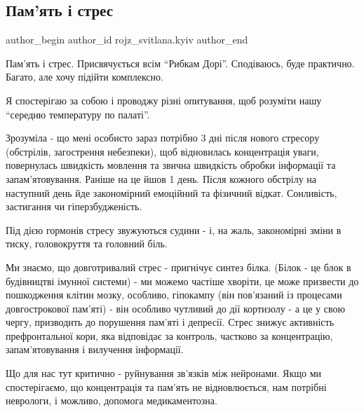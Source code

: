  
 
 
 
 

\subsection{Пам'ять і стрес}
\label{sec:30_01_2023.fb.rojz_svitlana.kyiv.1.pam_yat___stres}

\ifcmt
 author_begin
   author_id rojz_svitlana.kyiv
 author_end
\fi

Пам'ять і стрес. Присвячується всім \enquote{Рибкам Дорі}. Сподіваюсь, буде практично.
Багато, але хочу підійти комплексно. 

Я спостерігаю за собою і проводжу різні опитування, щоб розуміти нашу \enquote{середню
температуру по палаті}.

Зрозуміла - що мені особисто зараз потрібно 3 дні після нового стресору
(обстрілів, загострення небезпеки), щоб відновилась концентрація уваги,
повернулась швидкість мовлення та звична швидкість обробки інформації та
запам'ятовування. Раніше на це йшов 1 день. Після кожного обстрілу на наступний
день йде закономірний емоційний та фізичний відкат. Сонливість, застигання чи
гіперзбудженість.

Під дією гормонів стресу звужуються судини - і, на жаль, закономірні зміни в
тиску, головокруття та головний біль.

Ми знаємо, що довготривалий стрес - пригнічує синтез білка. (Білок - це блок в
будівництві імунної системи) - ми можемо частіше хворіти, це може призвести до
пошкодження клітин мозку, особливо, гіпокампу (він пов'язаний із процесами
довгострокової пам'яті) - він особливо чутливий до дії кортизолу - а це у свою
чергу, призводить до порушення пам'яті і депресії. Стрес знижує активність
префронтальної кори, яка відповідає за контроль, частково за концентрацію,
запам’ятовування і вилучення інформації.

Що для нас тут критично - руйнування зв'язків між нейронами. Якщо ми
спостерігаємо, що концентрація та пам'ять не відновлюється, нам потрібні
неврологи, і можливо, допомога медикаментозна.


